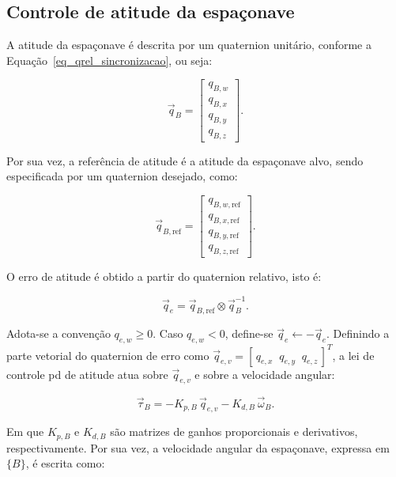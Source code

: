 \subsection{Controle de atitude da espaçonave}
\label{sec_controle_PD_atitude}

A atitude da espaçonave é descrita por um quaternion unitário, conforme a Equação~\eqref{eq_qrel_sincronizacao}, ou seja:

\begin{equation}
\vec q_B =
\begin{bmatrix}
q_{B,w} \\
q_{B,x} \\
q_{B,y} \\
q_{B,z}
\end{bmatrix}.
\end{equation}

Por sua vez, a referência de atitude é a atitude da espaçonave alvo, sendo especificada por um quaternion desejado, como:

\begin{equation}
\vec q_{B,\text{ref}} =
\begin{bmatrix}
q_{B,w,\text{ref}} \\
q_{B,x,\text{ref}} \\
q_{B,y,\text{ref}} \\
q_{B,z,\text{ref}}
\end{bmatrix}.
\end{equation}

O erro de atitude é obtido a partir do quaternion relativo, isto é:

\begin{equation}
\vec q_e
=
\vec q_{B,\text{ref}} \otimes \vec q_B^{-1}.
\label{eq_controle_PD_quat}
\end{equation}

Adota-se a convenção $q_{e,w}\ge 0$. Caso $q_{e,w}<0$, define-se $\vec q_e \leftarrow -\vec q_e$.
Definindo a parte vetorial do quaternion de erro como
$\vec q_{e,v} = [\,q_{e,x}\;\;q_{e,y}\;\;q_{e,z}\,]^T$,
a lei de controle \gls{pd} de atitude atua sobre $\vec q_{e,v}$ e sobre a velocidade angular:

\begin{equation}
\vec\tau_B
=
-K_{p,B}\,\vec q_{e,v}
-
K_{d,B}\,\vec\omega_B.
\label{eq_controle_PD_atitude}
\end{equation}

Em que \(K_{p,B}\) e \(K_{d,B}\) são matrizes de ganhos proporcionais e derivativos, respectivamente.
Por sua vez, a velocidade angular da espaçonave, expressa em $\{B\}$, é escrita como:

